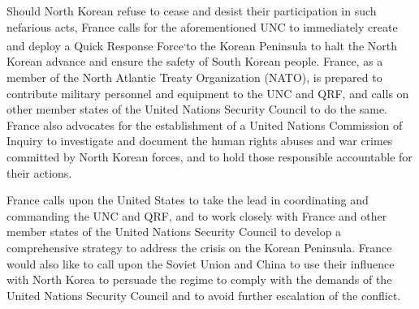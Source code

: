 \documentclass[a4paper,12pt]{article}
\begin{document}
Should North Korean refuse to cease and desist their participation in such nefarious acts, France calls for the aforementioned UNC to immediately create and deploy a Quick Response Force\footnotemark[1]\textsuperscript{,}\footnotemark[2] to the Korean Peninsula to halt the North Korean advance and ensure the safety of South Korean people. France, as a member of the North Atlantic Treaty Organization (NATO), is prepared to contribute military personnel and equipment to the UNC and QRF, and calls on other member states of the United Nations Security Council to do the same. France also advocates for the establishment of a United Nations Commission of Inquiry to investigate and document the human rights abuses and war crimes committed by North Korean forces, and to hold those responsible accountable for their actions.

France calls upon the United States to take the lead in coordinating and commanding the UNC and QRF, and to work closely with France and other member states of the United Nations Security Council to develop a comprehensive strategy to address the crisis on the Korean Peninsula. France would also like to call upon the Soviet Union and China to use their influence with North Korea to persuade the regime to comply with the demands of the United Nations Security Council and to avoid further escalation of the conflict.

\newpage
\end{document}
